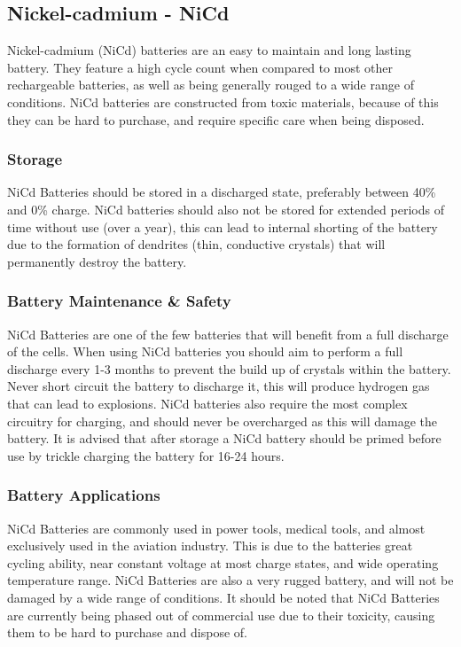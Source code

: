 \documentclass[a4paper,11pt, twocolumn]{article}
\begin{document}
\subsection{Nickel-cadmium - NiCd}

Nickel-cadmium (NiCd) batteries are an easy to maintain and long lasting battery. They feature a high cycle count when compared to most other rechargeable batteries, as well as being generally rouged to a wide range of conditions. NiCd batteries are constructed from toxic materials, because of this they can be hard to purchase, and require specific care when being disposed.

\subsubsection{Storage}

NiCd Batteries should be stored in a discharged state, preferably between 40\% and 0\% charge. NiCd batteries should also not be stored for extended periods of time without use (over a year), this can lead to internal shorting of the battery due to the formation of dendrites (thin, conductive crystals) that will permanently destroy the battery\cite{dendrites}. 

\subsubsection{Battery Maintenance \& Safety}

NiCd Batteries are one of the few batteries that will benefit from a full discharge of the cells. When using NiCd batteries you should aim to perform a full discharge every 1-3 months to prevent the build up of crystals within the battery. Never short circuit the battery to discharge it, this will produce hydrogen gas that can lead to explosions. 
NiCd batteries also require the most complex circuitry for charging, and should never be overcharged as this will damage the battery. 
It is advised that after storage a NiCd battery should be primed before use by trickle charging the battery for 16-24 hours.

\subsubsection{Battery Applications}

NiCd Batteries are commonly used in power tools, medical tools, and almost exclusively used in the aviation industry. This is due to the batteries great cycling ability, near constant voltage at most charge states, and wide operating temperature range. NiCd Batteries are also a very rugged battery, and will not be damaged by a wide range of conditions. It should be noted that NiCd Batteries are currently being phased out of commercial use due to their toxicity, causing them to be hard to purchase and dispose of.  
\end{document}
